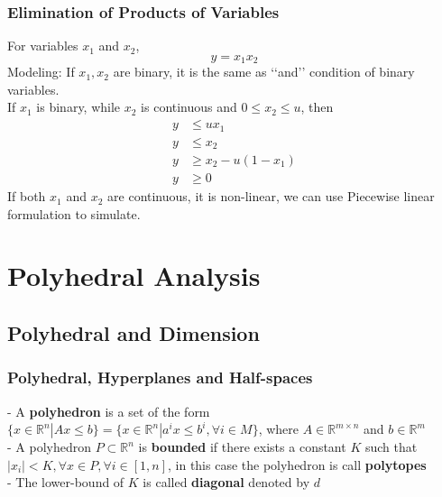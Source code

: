 			\subsection{Elimination of Products of Variables}
				For variables $x_1$ and $x_2$,
				\begin{equation}y = x_1 x_2\end{equation}
				Modeling: If $x_1, x_2$ are binary, it is the same as \lq\lq{}and\rq\rq{} condition of binary variables.\\
				If $x_1$ is binary, while $x_2$ is continuous and $0 \le x_2 \le u$, then
				\begin{align}
					y &\le ux_1  \\
					y &\le x_2  \\
					y &\ge x_2 - u(1- x_1)  \\
					y &\ge 0 
				\end{align}
				If both $x_1$ and $x_2$ are continuous, it is non-linear, we can use Piecewise linear formulation to simulate.

	\chapter{Polyhedral Analysis}
		\section{Polyhedral and Dimension}  
			\subsection{Polyhedral, Hyperplanes and Half-spaces}
				- A \textbf{polyhedron} is a set of the form $\{x\in \mathbb{R}^n|Ax\le b\}=\{x \in \mathbb{R}^n | a^ix\le b^i, \forall i \in M\}$, where $A \in \mathbb{R}^{m\times n}$ and $b \in \mathbb{R}^m$\\
				- A polyhedron $P \subset \mathbb{R}^n$ is \textbf{bounded} if there exists a constant $K$ such that $|x_i|<K, \forall x \in P, \forall i \in [1, n]$, in this case the polyhedron is call \textbf{polytopes}\\
				- The lower-bound of $K$ is called \textbf{diagonal} denoted by $d$\\
				
